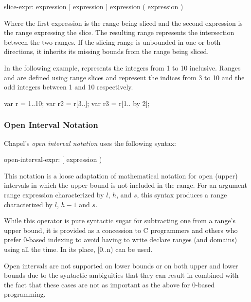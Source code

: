 \begin{syntax}
slice-expr:
  expression [ expression ]
  expression ( expression )
\end{syntax}

Where the first expression is the range being sliced and the second
expression is the range expressing the slice.  The resulting range
represents the intersection between the two ranges.  If the slicing
range is unbounded in one or both directions, it inherits its missing
bounds from the range being sliced.

\begin{example}
In the following example,  represents the integers from 1 to
10 inclusive.  Ranges  and  are defined using range
slices and represent the indices from 3 to 10 and the odd integers
between 1 and 10 respectively.
\begin{chapel}
var r = 1..10;
var r2 = r[3..];
var r3 = r[1.. by 2];
\end{chapel}
\end{example}

\subsubsection{Open Interval Notation}
\label{Open_Interval}

Chapel's \emph{open interval notation} uses the following syntax:

\begin{syntax}
open-interval-expr:
  [ expression )
\end{syntax}

This notation is a loose adaptation of mathematical notation for open
(upper) intervals in which the upper bound is not included in the
range.  For an argument range expression characterized by $l$, $h$,
and $s$, this syntax produces a range characterized by $l$, $h-1$ and
$s$.

\begin{rationale}
While this operator is pure syntactic sugar for subtracting one from a
range's upper bound, it is provided as a concession to C programmers
and others who prefer 0-based indexing to avoid having to write
declare ranges (and domains) using  all the time.  In its
place, [0..n) can be used.

Open intervals are not supported on lower bounds or on both upper and
lower bounds due to the syntactic ambiguities that they can result in
combined with the fact that these cases are not as important as the
above for 0-based programming.
\end{rationale}


